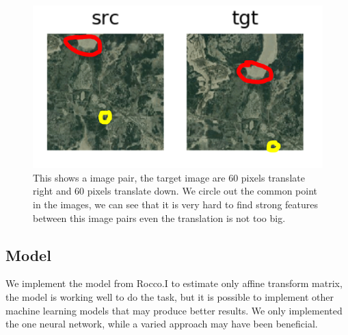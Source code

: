 \begin{figure}
\centering
\includegraphics[width = 5.0in]{figs/train_src_tgr}
\caption{This shows a image pair, the target image are 60 pixels translate right and 60 pixels translate down. We circle out the common point in the images, we can see that it is very hard to find strong features between this image pairs even the translation is not too big.}
\end{figure}


\subsection{Model}
 We implement the model from Rocco.I\citep{Rocco17} to estimate only affine transform matrix, the model is working well to do the task, but it is possible to implement other machine learning models that may produce better results. We only implemented the one neural network, while a varied approach may have been beneficial.
